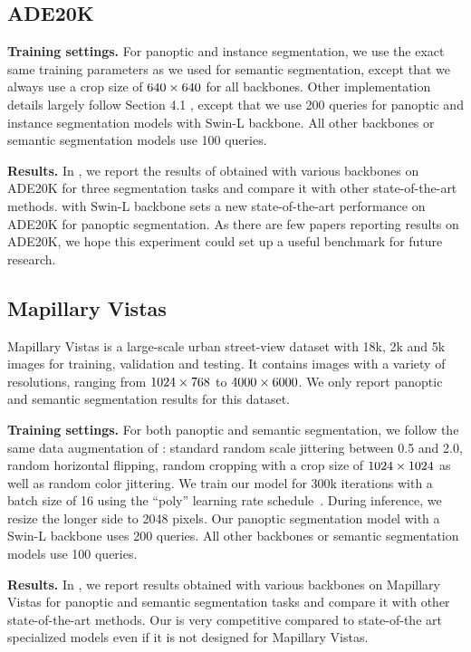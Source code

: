 \subsection{ADE20K}

\noindent\textbf{Training settings.} For panoptic and instance segmentation, we use the exact same training parameters as we used for semantic segmentation, except that we always use a crop size of $640 \times 640$ for all backbones. Other implementation details largely follow Section 4.1
, except that we use 200 queries for panoptic and instance segmentation models with Swin-L backbone. All other backbones or semantic segmentation models use 100 queries.

\noindent\textbf{Results.} In , we report the results of \modelname obtained with various backbones on ADE20K for three segmentation tasks and compare it with other state-of-the-art methods. \modelname with Swin-L backbone sets a new state-of-the-art performance on ADE20K for panoptic segmentation. As there are few papers reporting results on ADE20K, we hope this experiment could set up a useful benchmark for future research.

\subsection{Mapillary Vistas}
Mapillary Vistas is a large-scale urban street-view dataset with 18k, 2k and 5k images for training, validation and testing. It contains images with a variety of resolutions, ranging from $1024 \times 768$ to $4000 \times 6000$. We only report panoptic and semantic segmentation results for this dataset.

\noindent\textbf{Training settings.}
For both panoptic and semantic segmentation, we follow the same data augmentation of \cite{cheng2021maskformer}: standard random scale jittering between 0.5 and 2.0, random horizontal flipping, random cropping with a crop size of $1024 \times 1024$ as well as random color jittering. We train our model for 300k iterations with a batch size of 16 using the ``poly'' learning rate schedule~\cite{deeplabV2}. During inference, we resize the longer side to 2048 pixels. Our panoptic segmentation model with a Swin-L backbone uses 200 queries. All other backbones or semantic segmentation models use 100 queries.

\noindent\textbf{Results.}
In , we report \modelname results obtained with various backbones on Mapillary Vistas for panoptic and semantic segmentation tasks and compare it with other state-of-the-art methods. Our \modelname is very competitive compared to state-of-the art specialized models even if it is not designed for Mapillary Vistas.


